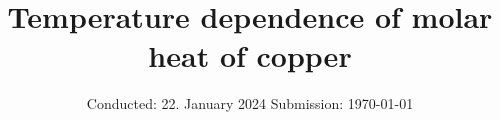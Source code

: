 

\subject{V47}
\title{Temperature dependence of molar heat of copper}
\date{%
  Conducted: 22. January 2024
  \hspace{3em}
  Submission: \today
}



\maketitle
\thispagestyle{empty}
\tableofcontents
\newpage








\printbibliography{}
%


